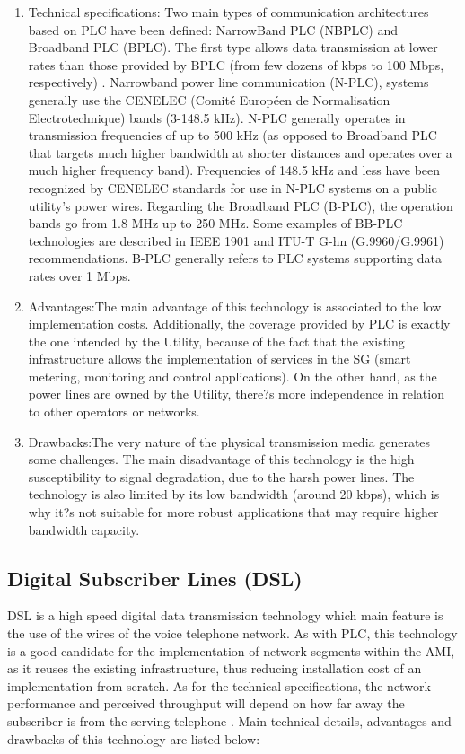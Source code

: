 \documentclass[11pt,final,onecolumn]{IEEEtran}
\begin{document}
\begin{enumerate}
	\item Technical specifications: Two main types of communication architectures based on PLC have been defined: NarrowBand PLC (NBPLC) and Broadband PLC (BPLC). The first type allows data transmission at lower rates than those provided by BPLC (from few dozens of kbps to 100 Mbps, respectively) \cite{Sabbah2014}. Narrowband power line communication (N-PLC), systems generally use the CENELEC (Comité Européen de Normalisation Electrotechnique) bands (3-148.5 kHz). N-PLC generally operates in transmission frequencies of up to 500 kHz (as opposed to Broadband PLC that targets much higher bandwidth at shorter distances and operates over a much higher frequency band). Frequencies of 148.5 kHz and less have been recognized by CENELEC standards for use in N-PLC systems on a public utility’s power wires. 
Regarding the Broadband PLC (B-PLC), the operation bands go from 1.8 MHz up to 250 MHz. Some examples of BB-PLC technologies are described in IEEE 1901 and ITU-T G-hn (G.9960/G.9961) recommendations. B-PLC generally refers to PLC systems supporting data rates over 1 Mbps.
	\item Advantages:The main advantage of this technology is associated to the low implementation costs. Additionally, the coverage provided by PLC is exactly the one intended by the Utility, because of the fact that the existing infrastructure allows the implementation of services in the SG (smart metering, monitoring and control applications). On the other hand, as the power lines are owned by the Utility, there?s more independence in relation to other operators or networks. 
	\item Drawbacks:The very nature of the physical transmission media generates some challenges. The main disadvantage of this technology is the high susceptibility to signal degradation, due to the harsh power lines. The technology is also limited by its low bandwidth (around 20 kbps), which is why it?s not suitable for more robust applications that may require higher bandwidth capacity.
\end{enumerate}

\subsection{Digital Subscriber Lines (DSL)}\label{dsl}
DSL is a high speed digital data transmission technology which main feature is the use of the wires of the voice telephone network. As with PLC, this technology is a good candidate for the implementation of network segments within the AMI, as it reuses the existing infrastructure, thus reducing installation cost of an implementation from scratch. As for the technical specifications, the network performance and perceived throughput will depend on how far away the subscriber is from the serving telephone  \cite{Gungor2011}. Main technical details, advantages and drawbacks of this technology are listed below:
\end{document}
